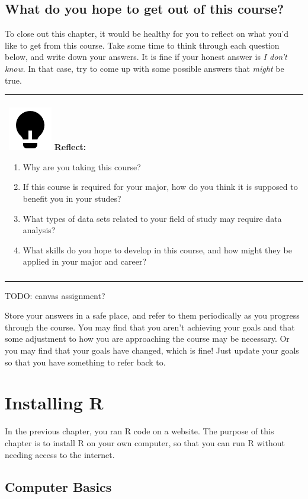 \documentclass[
]{book}
\providecommand{\tightlist}{%
  \setlength{\itemsep}{0pt}\setlength{\parskip}{0pt}}
\newenvironment{reflect}
{
  \begin{center}
  \begin{tabular}{|>{\columncolor{reflect}}p{0.9\textwidth}|}
  \hline\\
  \includegraphics[scale=0.1]{src/images/lightbulb-fill.png}
  \textbf{Reflect:}
}
{\\\\\hline
  \end{tabular}
  \end{center}
}
\begin{document}
\hypertarget{getoutoftheclass}{%
\section{What do you hope to get out of this course?}\label{getoutoftheclass}}

To close out this chapter, it would be healthy for you to reflect on what you'd like to get from this course.
Take some time to think through each question below, and write down your answers.
It is fine if your honest answer is \emph{I don't know}.
In that case, try to come up with some possible answers that \emph{might} be true.

\begin{reflect}
\begin{enumerate}
\def\labelenumi{\arabic{enumi}.}
\tightlist
\item
  Why are you taking this course?
\item
  If this course is required for your major, how do you think it is
  supposed to benefit you in your studes?
\item
  What types of data sets related to your field of study may require
  data analysis?
\item
  What skills do you hope to develop in this course, and how might they
  be applied in your major and career?
\end{enumerate}
\end{reflect}

TODO: canvas assignment?

Store your answers in a safe place, and refer to them periodically as you progress through the course.
You may find that you aren't achieving your goals and that some adjustment to how you are approaching the course may be necessary.
Or you may find that your goals have changed, which is fine!
Just update your goals so that you have something to refer back to.

\hypertarget{installingr}{%
\chapter{Installing R}\label{installingr}}

In the previous chapter, you ran R code on a website.
The purpose of this chapter is to install R on your own computer, so that you can run R without needing access to the internet.

\hypertarget{computer-basics}{%
\section{Computer Basics}\label{computer-basics}}
\end{document}
